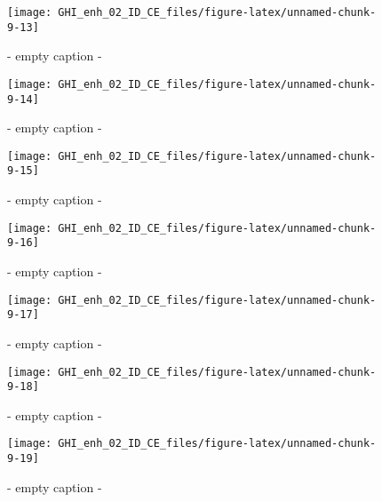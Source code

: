 \documentclass[
  10pt,
  a4paper,oneside]{article}
\begin{document}
\begin{figure}[H]

{\centering \texttt{[image: GHI\_enh\_02\_ID\_CE\_files/figure-latex/unnamed-chunk-9-13]} 

}

\caption{ - empty caption - }\label{fig:unnamed-chunk-9-13}
\end{figure}
\begin{figure}[H]

{\centering \texttt{[image: GHI\_enh\_02\_ID\_CE\_files/figure-latex/unnamed-chunk-9-14]} 

}

\caption{ - empty caption - }\label{fig:unnamed-chunk-9-14}
\end{figure}
\begin{figure}[H]

{\centering \texttt{[image: GHI\_enh\_02\_ID\_CE\_files/figure-latex/unnamed-chunk-9-15]} 

}

\caption{ - empty caption - }\label{fig:unnamed-chunk-9-15}
\end{figure}
\begin{figure}[H]

{\centering \texttt{[image: GHI\_enh\_02\_ID\_CE\_files/figure-latex/unnamed-chunk-9-16]} 

}

\caption{ - empty caption - }\label{fig:unnamed-chunk-9-16}
\end{figure}
\begin{figure}[H]

{\centering \texttt{[image: GHI\_enh\_02\_ID\_CE\_files/figure-latex/unnamed-chunk-9-17]} 

}

\caption{ - empty caption - }\label{fig:unnamed-chunk-9-17}
\end{figure}
\begin{figure}[H]

{\centering \texttt{[image: GHI\_enh\_02\_ID\_CE\_files/figure-latex/unnamed-chunk-9-18]} 

}

\caption{ - empty caption - }\label{fig:unnamed-chunk-9-18}
\end{figure}
\begin{figure}[H]

{\centering \texttt{[image: GHI\_enh\_02\_ID\_CE\_files/figure-latex/unnamed-chunk-9-19]} 

}

\caption{ - empty caption - }\label{fig:unnamed-chunk-9-19}
\end{figure}
\end{document}
